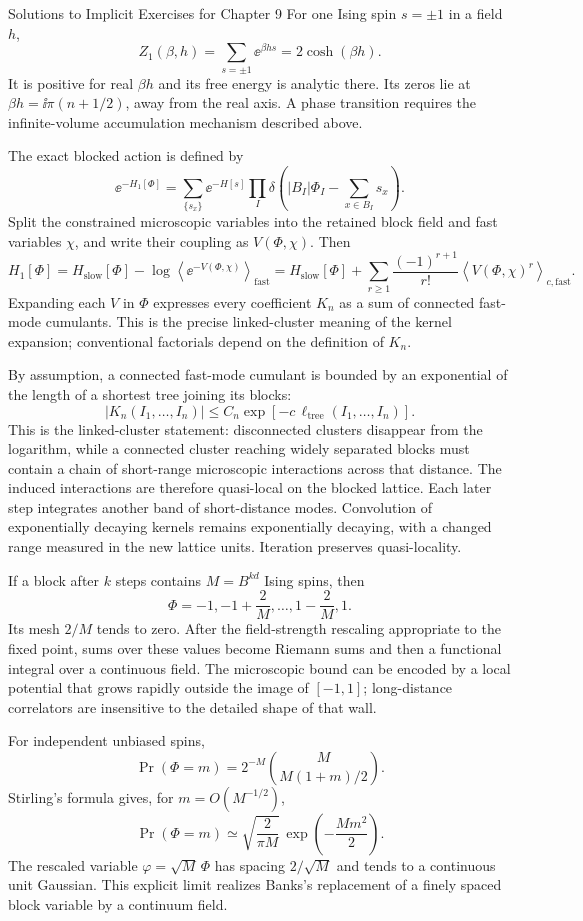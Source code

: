 \begin{bankssolutions}{Solutions to Implicit Exercises for Chapter 9}
For one Ising spin $s=\pm1$ in a field $h$,
\[
  Z_1(\beta,h)=\sum_{s=\pm1}\ee^{\beta hs}=2\cosh(\beta h).
\]
It is positive for real $\beta h$ and its free energy is analytic there.  Its
zeros lie at $\beta h=\ii\pi(n+1/2)$, away from the real axis.  A phase
transition requires the infinite-volume accumulation mechanism described
above.

The exact blocked action is defined by
\[
  \ee^{-H_1[\Phi]}=
  \sum_{\{s_x\}}\ee^{-H[s]}
  \prod_I\delta\!\left(
  |B_I|\Phi_I-\sum_{x\in B_I}s_x\right).
\]
Split the constrained microscopic variables into the retained block field and
fast variables $\chi$, and write their coupling as $V(\Phi,\chi)$.  Then
\[
  H_1[\Phi]=H_{\mathrm{slow}}[\Phi]
  -\log\left\langle\ee^{-V(\Phi,\chi)}\right\rangle_{\!\mathrm{fast}}
  =H_{\mathrm{slow}}[\Phi]
  +\sum_{r\geq1}\frac{(-1)^{r+1}}{r!}
  \left\langle V(\Phi,\chi)^r\right\rangle_{\!c,\mathrm{fast}}.
\]
Expanding each $V$ in $\Phi$ expresses every coefficient $K_n$ as a sum of
connected fast-mode cumulants.  This is the precise linked-cluster meaning of
the kernel expansion; conventional factorials depend on the definition of
$K_n$.

By assumption, a connected fast-mode cumulant is bounded by an exponential
of the length of a shortest tree joining its blocks:
\[
  |K_n(I_1,\ldots,I_n)|
  \leq C_n\exp[-c\,\ell_{\mathrm{tree}}(I_1,\ldots,I_n)].
\]
This is the linked-cluster statement: disconnected clusters disappear from
the logarithm, while a connected cluster reaching widely separated blocks
must contain a chain of short-range microscopic interactions across that
distance.  The induced interactions are therefore quasi-local on the blocked
lattice.  Each later step integrates another band of short-distance modes.
Convolution of exponentially decaying kernels remains exponentially decaying,
with a changed range measured in the new lattice units.  Iteration preserves
quasi-locality.

If a block after $k$ steps contains $M=B^{kd}$ Ising spins, then
\[
  \Phi=-1,-1+\frac2M,\ldots,1-\frac2M,1.
\]
Its mesh $2/M$ tends to zero.  After the field-strength rescaling appropriate
to the fixed point, sums over these values become Riemann sums and then a
functional integral over a continuous field.  The microscopic bound can be
encoded by a local potential that grows rapidly outside the image of
$[-1,1]$; long-distance correlators are insensitive to the detailed shape of
that wall.

For independent unbiased spins,
\[
  \Pr(\Phi=m)=2^{-M}{M\choose M(1+m)/2}.
\]
Stirling's formula gives, for $m=O(M^{-1/2})$,
\[
  \Pr(\Phi=m)\simeq
  \sqrt{\frac{2}{\pi M}}\,
  \exp\!\left(-\frac{Mm^2}{2}\right).
\]
The rescaled variable $\varphi=\sqrt M\,\Phi$ has spacing $2/\sqrt M$ and
tends to a continuous unit Gaussian.  This explicit limit realizes Banks's
replacement of a finely spaced block variable by a continuum field.


\end{bankssolutions}
